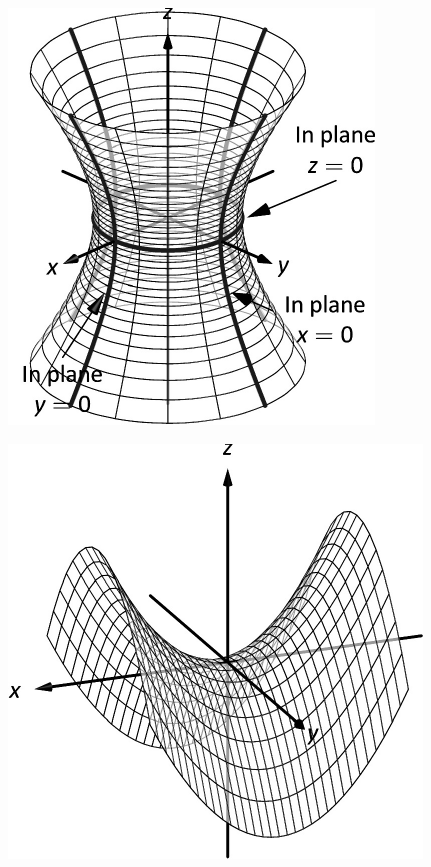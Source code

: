 \documentclass[10pt]{article}
\begin{document}
\includegraphics{figquadric_hyp_one_sheetb_3DBW.pdf}
\texttt{}

\includegraphics{figquadric_hyp_par_3DBW.pdf}
\texttt{}
\end{document}
